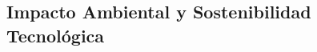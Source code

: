\begin{refsection}
\chapter{Impacto Ambiental y Sostenibilidad Tecnológica}
\label{chapter:chapter-7}


\begin{comment}
\begin{enumerate}
\item \textbf{Impacto Ambiental y Sostenibilidad Tecnológica (Capítulo 7):}  
\begin{itemize}
    \item Evaluación del impacto ambiental de tecnologías como centros de datos e IA.
    \item Estrategias para computación verde y edge computing.
    \item Uso de Python para modelar el consumo energético y la huella de carbono.
    \item Actividad: Calcular la eficiencia energética de un modelo de aprendizaje profundo con \texttt{NumPy}.
\end{itemize}
\end{enumerate}
\end{comment}



\nocite{*}

\printbibliography[heading=subbibliography, title={Bibliografía del Capítulo 7}]
\end{refsection}
